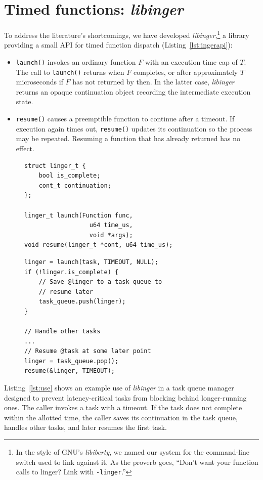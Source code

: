 \section{Timed functions: \textit{libinger}}
\label{sec:libinger}

To address the literature's shortcomings, we have developed
\textit{libinger},\footnote{In the style of GNU's \textit{libiberty}, we named our
system for the command-line switch used to link against it.  As the proverb goes,
``Don't want your function calls to linger?  Link with \texttt{-linger}.''}
a library providing a small API for timed function dispatch
(Listing~\ref{lst:ingerapi}):
\begin{itemize}
\item \texttt{launch()} invokes an ordinary function $F$ with an
execution time cap of $T$.  The call to \texttt{launch()} returns when $F$
completes, or after approximately $T$ microseconds if $F$ has not returned
by then.  In the latter case, \textit{libinger} returns an opaque continuation
object recording the intermediate execution state.
\item \texttt{resume()} causes a preemptible function to continue after a timeout.
If execution again times out, \texttt{resume()} updates its continuation so the
process may be repeated.  Resuming a function that has already returned has no
effect.
\end{itemize}

\begin{figure}
\begin{lstlisting}[label=lst:ingerapi,caption=Preemptible functions core interface]
struct linger_t {
	bool is_complete;
	cont_t continuation;
};

linger_t launch(Function func,
                  u64 time_us,
                  void *args);
void resume(linger_t *cont, u64 time_us);
\end{lstlisting}
\begin{lstlisting}[label=lst:use, caption=Preemptible function usage example]
linger = launch(task, TIMEOUT, NULL);
if (!linger.is_complete) {
	// Save @linger to a task queue to
	// resume later
	task_queue.push(linger);
}

// Handle other tasks
...
// Resume @task at some later point
linger = task_queue.pop();
resume(&linger, TIMEOUT);
\end{lstlisting}
\end{figure}

Listing~\ref{lst:use} shows an example use of \textit{libinger}
in a task queue manager designed to prevent latency-critical tasks from blocking
behind longer-running
ones. The caller invokes a task with a timeout. If the task does not complete
within the allotted time, the caller saves its continuation in the task queue,
handles other tasks, and later resumes the first task.


